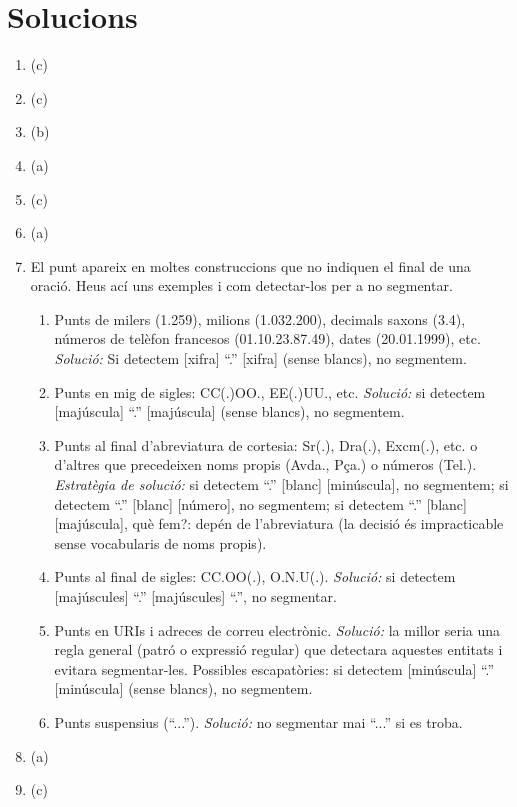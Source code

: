 \section{Solucions}
\begin{enumerate}
\item (c)
\item (c)
\item (b)
\item (a)
\item (c)
\item (a)
\item El punt apareix en moltes construccions que no indiquen el final de
   una oració. Heus ací uns exemples i com detectar-los per a no
   segmentar.

   \begin{enumerate}
   \item Punts de milers (1.259), milions (1.032.200), decimals saxons
     (3.4), números de telèfon francesos (01.10.23.87.49), dates
     (20.01.1999), etc. \emph{Solució:} 
     Si detectem [xifra] ``.'' [xifra] (sense blancs), no
     segmentem.
     
    \item Punts en mig de sigles: CC(.)OO., EE(.)UU.,
      etc. \emph{Solució:} 
      si detectem [majúscula] ``.'' [majúscula] (sense blancs),
     no segmentem.
     
    \item Punts al final d'abreviatura de cortesia: Sr(.), Dra(.),
     Excm(.), etc. o d'altres que precedeixen noms propis (Avda.,
     Pça.) o números (Tel.). \emph{Estratègia de solució:}
     si detectem ``.'' [blanc] [minúscula], no segmentem;  si detectem
     ``.'' [blanc] [número], no segmentem;    
     si detectem ``.'' [blanc] [majúscula], què fem?: depén de
     l'abreviatura (la decisió és impracticable sense vocabularis de
     noms propis).
  
     \item Punts al final de sigles: CC.OO(.), O.N.U(.). \emph{Solució:}
      si detectem [majúscules] ``.'' [majúscules] ``.'', no segmentar.
     
     \item Punts en URIs i adreces de correu electrònic.
       \emph{Solució:} la millor seria una regla general (patró o expressió
     regular) que detectara aquestes entitats i evitara segmentar-les.
     Possibles escapatòries:  
     si detectem [minúscula] ``.'' [minúscula] (sense blancs), no
     segmentem.
     
     \item Punts suspensius (``...''). \emph{Solució:}
      no segmentar mai ``...'' si es troba.
     
 \end{enumerate}

\item (a)
\item (c)


\end{enumerate}

